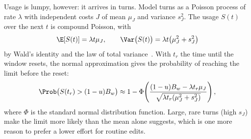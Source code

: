 Usage is lumpy, however: it arrives in turns. Model turns as a Poisson process
of rate $\lambda$ with independent costs $J$ of mean $\mu_J$ and variance
$s_J^2$. The usage $S(t)$ over the next $t$ is compound Poisson, with
\begin{equation}
  \E[S(t)] = \lambda t \mu_J, \qquad
  \Var\bigl(S(t)\bigr) = \lambda t \bigl(\mu_J^2 + s_J^2\bigr)
  \label{eq:compound}
\end{equation}
by Wald's identity and the law of total variance~\cite{feller1968}. With $t_r$ the time until the window
resets, the normal approximation gives the probability of reaching the limit
before the reset:
\begin{equation}
  \Prob\bigl(S(t_r) > (1 - u) B_w\bigr) \approx
  1 - \Phi\!\left(
    \frac{(1 - u) B_w - \lambda t_r \mu_J}
         {\sqrt{\lambda t_r (\mu_J^2 + s_J^2)}}
  \right),
  \label{eq:limit-probability}
\end{equation}
where $\Phi$ is the standard normal distribution function. Large, rare turns
(high $s_J$) make the limit more likely than the mean alone suggests, which is
one more reason to prefer a lower effort for routine edits.
